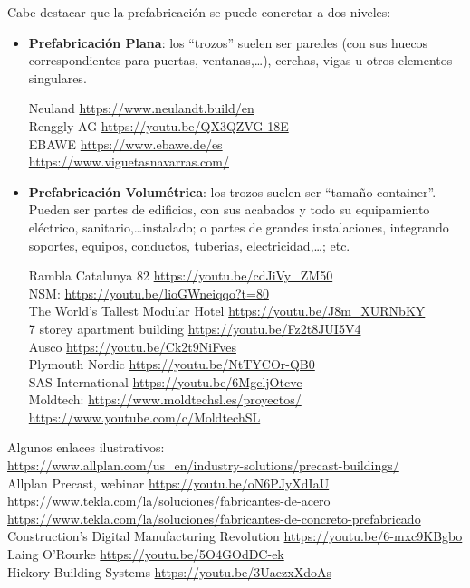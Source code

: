\documentclass[spanish,12pt,a4paper,final,oneside]{book}
\begin{document}
Cabe destacar que la prefabricación se puede concretar a dos niveles:
\begin{itemize}

\item \textbf{Prefabricación Plana}: los ``trozos'' suelen ser paredes (con sus huecos correspondientes para puertas, ventanas,\ldots), cerchas, vigas u otros elementos singulares. 

Neuland \url{https://www.neulandt.build/en}
\\Renggly AG \url{https://youtu.be/QX3QZVG-18E}
\\EBAWE \url{https://www.ebawe.de/es}
\\ \url{https://www.viguetasnavarras.com/}


\item \textbf{Prefabricación Volumétrica}: los trozos suelen ser ``tamaño container''. Pueden ser partes de edificios, con sus acabados y todo su equipamiento eléctrico, sanitario,\ldots instalado; o partes de grandes instalaciones, integrando soportes, equipos, conductos, tuberias, electricidad,\ldots; etc.

Rambla Catalunya 82 \url{https://youtu.be/cdJiVy_ZM50}
\\NSM: \url{https://youtu.be/lioGWneiqqo?t=80}
\\The World's Tallest Modular Hotel \url{https://youtu.be/J8m_XURNbKY}
\\7 storey apartment building \url{https://youtu.be/Fz2t8JUI5V4}
\\Ausco \url{https://youtu.be/Ck2t9NiFves}
\\Plymouth Nordic \url{https://youtu.be/NtTYCOr-QB0}
\\SAS International \url{https://youtu.be/6MgcljOtcvc}
\\Moldtech: \url{https://www.moldtechsl.es/proyectos/}
\\ \url{https://www.youtube.com/c/MoldtechSL}

\end{itemize}


Algunos enlaces ilustrativos:
\\ \url{https://www.allplan.com/us_en/industry-solutions/precast-buildings/}
\\Allplan Precast, webinar \url{https://youtu.be/oN6PJyXdIaU}
\\ \url{https://www.tekla.com/la/soluciones/fabricantes-de-acero}
\\ \url{https://www.tekla.com/la/soluciones/fabricantes-de-concreto-prefabricado}
\\Construction's Digital Manufacturing Revolution \url{https://youtu.be/6-mxc9KBgbo}
\\Laing O'Rourke \url{https://youtu.be/5O4GOdDC-ek}
\\Hickory Building Systems \url{https://youtu.be/3UaezxXdoAs}
\end{document}
